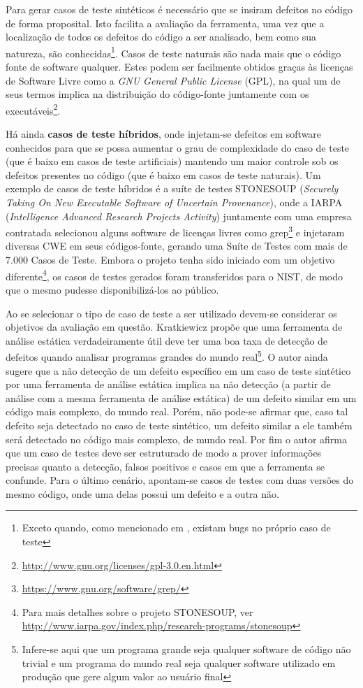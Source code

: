   Para gerar casos de teste sintéticos é necessário que se insiram defeitos no código de forma proposital. Isto facilita a avaliação da ferramenta, uma vez que a localização de todos os defeitos do código a ser analisado, bem como sua natureza, são conhecidas\footnote{Exceto quando, como mencionado em \cite{pascal}, existam bugs no próprio caso de teste}. Casos de teste naturais são nada mais que o código fonte de software qualquer. Estes podem ser facilmente obtidos graças às licenças de Software Livre como a \textit{GNU General Public License} (GPL),  na qual um de seus termos implica na distribuição do código-fonte juntamente com os executáveis\footnote{\url{http://www.gnu.org/licenses/gpl-3.0.en.html}}.

  Há ainda \textbf{casos de teste híbridos}, onde injetam-se defeitos em software conhecidos para que se possa aumentar o grau de complexidade do caso de teste (que é baixo em casos de teste artificiais) mantendo um maior controle sob os defeitos presentes no código (que é baixo em casos de teste naturais). Um exemplo de casos de teste híbridos é a suíte de testes STONESOUP (\textit{Securely Taking On New Executable Software of Uncertain Provenance}), onde a IARPA (\textit{Intelligence Advanced Research Projects Activity}) juntamente com uma empresa contratada selecionou alguns software de licenças livres como grep\footnote{\url{https://www.gnu.org/software/grep/}} e injetaram diversas CWE em seus códigos-fonte, gerando uma Suíte de Testes com mais de 7.000 Casos de Teste. Embora o projeto tenha sido iniciado com um objetivo diferente\footnote{Para mais detalhes sobre o projeto STONESOUP, ver \url{http://www.iarpa.gov/index.php/research-programs/stonesoup}}, os casos de testes gerados foram transferidos para o NIST, de modo que o mesmo pudesse disponibilizá-los ao público.

  Ao se selecionar o tipo de caso de teste a ser utilizado devem-se considerar os objetivos da avaliação em questão. Kratkiewicz \cite{harvard} propõe que uma ferramenta de análise estática verdadeiramente útil deve ter uma boa taxa de detecção de defeitos quando  analisar programas grandes do mundo real\footnote{Infere-se aqui que um programa grande seja qualquer software de código não trivial e um programa do mundo real seja qualquer software utilizado em produção que gere algum valor ao usuário final}. O autor ainda sugere que a não detecção de um defeito específico em um caso de teste sintético por uma ferramenta de análise estática implica na não detecção (a partir de análise com a mesma ferramenta de análise estática) de um defeito similar em um código mais complexo, do mundo real. Porém, não pode-se afirmar que, caso tal defeito seja detectado no caso de teste sintético, um defeito similar a ele também será detectado no código mais complexo, de mundo real. Por fim o autor afirma que um caso de testes deve ser estruturado de modo a prover informações precisas quanto a detecção, falsos positivos e casos em que a ferramenta se confunde. Para o último cenário, apontam-se casos de testes com duas versões do mesmo código, onde uma delas possui um defeito e a outra não.

